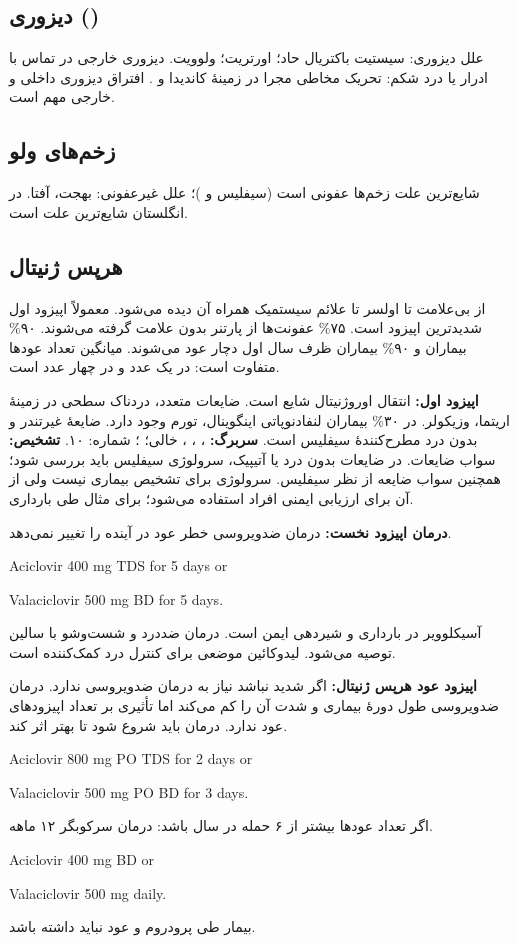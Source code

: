 \documentclass[12pt,a4paper]{article}
\begin{document}
\subsection*{دیزوری ()}
علل دیزوری: سیستیت باکتریال حاد؛ اورتریت؛ ولوویت.
دیزوری خارجی در تماس با ادرار یا درد شکم: تحریک مخاطی مجرا در زمینهٔ کاندیدا و .
افتراق دیزوری داخلی و خارجی مهم است.
\subsection*{زخم‌های ولو}
شایع‌ترین علت زخم‌ها عفونی است (سیفلیس و )؛ علل غیرعفونی: بهجت، آفتا.
 در انگلستان شایع‌ترین علت است.
\subsection*{هرپس ژنیتال}
از بی‌علامت تا اولسر تا علائم سیستمیک همراه آن دیده می‌شود.
معمولاً اپیزود اول شدیدترین اپیزود است.
۷۵\% عفونت‌ها از پارتنر بدون علامت گرفته می‌شوند.
۹۰\% بیماران  و ۹۰\% بیماران  ظرف سال اول دچار عود می‌شوند.
میانگین تعداد عودها متفاوت است: در  یک عدد و در  چهار عدد است.

\textbf{اپیزود اول:} انتقال اوروژنیتال شایع است.
ضایعات متعدد، دردناک سطحی در زمینهٔ اریتما، وزیکولر.
در ۳۰\% بیماران لنفادنوپاتی اینگوینال، تورم وجود دارد.
ضایعهٔ غیرتندر و بدون درد مطرح‌کنندهٔ سیفلیس است.
\textbf{سربرگ:} ، ، ،  خالی؛ ؛ شماره: ۱۰.
\textbf{تشخیص:}  سواب ضایعات.
در ضایعات بدون درد یا آتیپیک، سرولوژی سیفلیس باید بررسی شود؛ همچنین  سواب ضایعه از نظر سیفلیس.
سرولوژی  برای تشخیص بیماری نیست ولی از آن برای ارزیابی ایمنی افراد استفاده می‌شود؛ برای مثال طی بارداری.

\textbf{درمان اپیزود نخست:} درمان ضدویروسی خطر عود در آینده را تغییر نمی‌دهد.
\begin{latin}
Aciclovir 400 mg TDS for 5 days or\par
Valaciclovir 500 mg BD for 5 days.
\end{latin}
آسیکلوویر در بارداری و شیردهی ایمن است.
درمان ضددرد و شست‌وشو با سالین توصیه می‌شود.
لیدوکائین موضعی برای کنترل درد کمک‌کننده است.

\textbf{اپیزود عود هرپس ژنیتال:}
اگر شدید نباشد نیاز به درمان ضدویروسی ندارد.
درمان ضدویروسی طول دورهٔ بیماری و شدت آن را کم می‌کند اما تأثیری بر تعداد اپیزودهای عود ندارد.
درمان باید  شروع شود تا بهتر اثر کند.
\begin{latin}
Aciclovir 800 mg PO TDS for 2 days or\par
Valaciclovir 500 mg PO BD for 3 days.
\end{latin}
اگر تعداد عودها بیشتر از ۶ حمله در سال باشد: درمان سرکوبگر ۱۲ ماهه.
\begin{latin}
Aciclovir 400 mg BD or\par
Valaciclovir 500 mg daily.
\end{latin}
بیمار طی پرودروم و عود نباید  داشته باشد.
\end{document}
